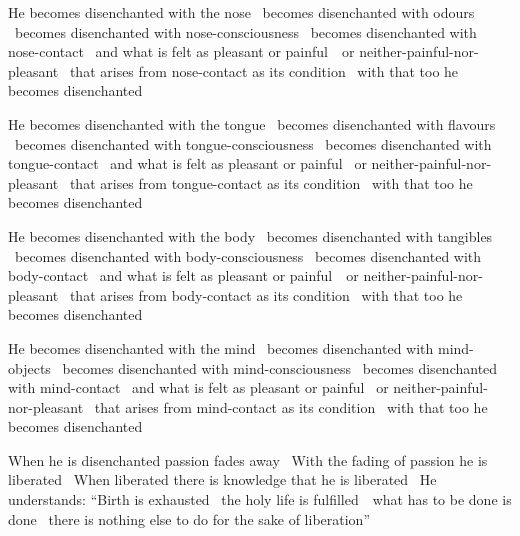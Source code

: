\begin{english-only-hang}
  He becomes disenchanted with the nose \breathmark\ becomes disenchanted with odours \breathmark\ becomes disenchanted with nose-consciousness \breathmark\ becomes disenchanted with nose-contact \breathmark\ and what is felt as pleasant or \mbox{painful}~\breathmark\ or neither-painful-nor-pleasant \breathmark\ that arises from nose-contact as its condition \breathmark\ with that too he becomes disenchanted
\end{english-only-hang}

\begin{english-only-hang}
  He becomes disenchanted with the tongue \breathmark\ becomes disenchanted with flavours \breathmark\ becomes disenchanted with tongue-consciousness \breathmark\ \ifbfiveversion\clearpage\fi becomes disenchanted with tongue-contact \breathmark\ and what is felt as pleasant or painful \breathmark\ or neither-painful-nor-pleasant \breathmark\ that arises from tongue-contact as its condition \breathmark\ with that too he becomes disenchanted
\end{english-only-hang}

\begin{english-only-hang}
  He becomes disenchanted with the body \breathmark\ becomes disenchanted with tangibles \breathmark\ becomes disenchanted with body-consciousness \breathmark\ becomes disenchanted with body-contact \breathmark\ and what is felt as pleasant or \mbox{painful}~\breathmark\ or neither-painful-nor-pleasant \breathmark\ that arises from body-contact as its condition \breathmark\ with that too he becomes disenchanted
\end{english-only-hang}

\begin{english-only-hang}
  He becomes disenchanted with the mind \breathmark\ becomes disenchanted with mind-objects \breathmark\ becomes disenchanted with mind-consciousness \breathmark\ becomes disenchanted with mind-contact \breathmark\ and what is felt as pleasant or painful \breathmark\ or neither-painful-nor-pleasant \breathmark\ that arises from mind-contact as its condition \breathmark\ with that too he becomes disenchanted
\end{english-only-hang}

\begin{english-only-hang}
  When he is disenchanted passion fades away \breathmark\ With the fading of passion he is liberated \breathmark\ When liberated there is knowledge that he is liberated \breathmark\ He understands: ``Birth is exhausted \breathmark\ the holy life is \mbox{fulfilled}~\breathmark\ what has to be done is done \breathmark\ there is nothing else to do for the sake of liberation''
\end{english-only-hang}

